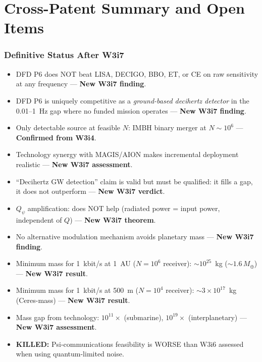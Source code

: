 \documentclass[11pt]{article}
\theoremstyle{definition}
\theoremstyle{remark}
\newcommand{\ee}[1]{\times10^{#1}}
\newcommand{\Qpsi}{Q_\psi}
\newcommand{\killed}[1]{\textcolor{red!70!black}{\textbf{KILLED:} #1}}
\begin{document}
\part{Cross-Patent Summary and Open Items}
\label{part:summary}

\section{Definitive Status After W3i7}
\label{sec:status}

\begin{tcolorbox}[colback=green!5!white, colframe=green!40!black,
  title=\textbf{P6: Decihertz Detection --- Context-Dependent Claim}]
\begin{itemize}[nosep]
\item DFD P6 does NOT beat LISA, DECIGO, BBO, ET, or CE on raw sensitivity
  at any frequency --- \textbf{New W3i7 finding}.
\item DFD P6 is uniquely competitive as a \emph{ground-based decihertz
  detector} in the 0.01--1~Hz gap where no funded mission operates ---
  \textbf{New W3i7 finding}.
\item Only detectable source at feasible $N$: IMBH binary merger at
  $N \sim 10^6$ --- \textbf{Confirmed from W3i4}.
\item Technology synergy with MAGIS/AION makes incremental deployment
  realistic --- \textbf{New W3i7 assessment}.
\item ``Decihertz GW detection'' claim is valid but must be qualified:
  it fills a gap, it does not outperform --- \textbf{New W3i7 verdict}.
\end{itemize}
\end{tcolorbox}

\begin{tcolorbox}[colback=red!5!white, colframe=red!60!black,
  title=\textbf{P8: Communications --- Even More Infeasible}]
\begin{itemize}[nosep]
\item $\Qpsi$ amplification: does NOT help (radiated power = input power,
  independent of $Q$) --- \textbf{New W3i7 theorem}.
\item No alternative modulation mechanism avoids planetary mass ---
  \textbf{New W3i7 finding}.
\item Minimum mass for 1~kbit/s at 1~AU ($N = 10^6$ receiver):
  $\sim 10^{25}$~kg ($\sim 1.6\,M_\oplus$) --- \textbf{New W3i7 result}.
\item Minimum mass for 1~kbit/s at 500~m ($N = 10^4$ receiver):
  $\sim 3\ee{17}$~kg (Ceres-mass) --- \textbf{New W3i7 result}.
\item Mass gap from technology: $10^{11}\times$ (submarine),
  $10^{19}\times$ (interplanetary) --- \textbf{New W3i7 assessment}.
\item \killed{Psi-communications feasibility is WORSE than W3i6 assessed
  when using quantum-limited noise.}
\end{itemize}
\end{tcolorbox}
\end{document}
